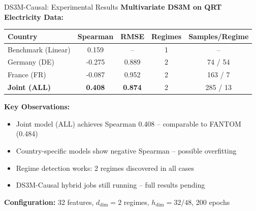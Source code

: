\documentclass[aspectratio=169]{beamer}
\begin{document}
\begin{frame}{DS3M-Causal: Experimental Results}
\textbf{Multivariate DS3M on QRT Electricity Data:}

\vspace{0.2cm}
\begin{table}
\centering
\small
\begin{tabular}{l|c|c|c|c}
\toprule
\textbf{Country} & \textbf{Spearman} & \textbf{RMSE} & \textbf{Regimes} & \textbf{Samples/Regime} \\
\midrule
\rowcolor{lightgray} Benchmark (Linear) & 0.159 & -- & 1 & -- \\
\midrule
Germany (DE) & \textcolor{warnred}{-0.275} & 0.889 & 2 & 74 / 54 \\
France (FR) & \textcolor{warnred}{-0.087} & 0.952 & 2 & 163 / 7 \\
\textcolor{reprogreen}{\textbf{Joint (ALL)}} & \textcolor{reprogreen}{\textbf{0.408}} & \textbf{0.874} & 2 & 285 / 13 \\
\bottomrule
\end{tabular}
\end{table}

\vspace{0.2cm}
\textbf{Key Observations:}
\begin{itemize}
    \item \textcolor{reprogreen}{Joint model (ALL) achieves Spearman 0.408} -- comparable to FANTOM (0.484)
    \item Country-specific models show negative Spearman -- possible overfitting
    \item Regime detection works: 2 regimes discovered in all cases
    \item \textcolor{warnred}{DS3M-Causal hybrid jobs still running} -- full results pending
\end{itemize}

\vspace{0.2cm}
\textbf{Configuration:} 32 features, $d_{\text{dim}}=2$ regimes, $h_{\text{dim}}=32/48$, 200 epochs
\end{frame}
\end{document}
